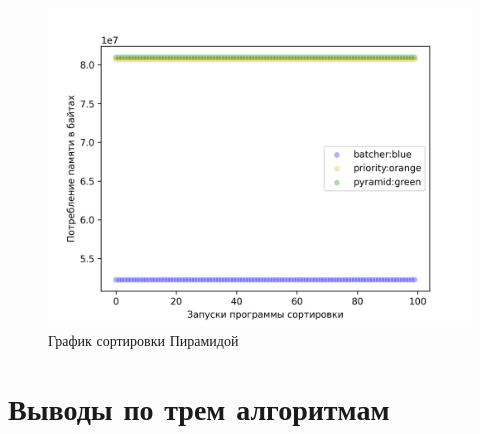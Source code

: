 \begin{figure}[H]
    \centering
    \includegraphics[width=1\textwidth]{./plots/bitonic_memory.png}
    \caption{График сортировки Пирамидой}
\end{figure}

\section{Выводы по трем алгоритмам}





























% 




